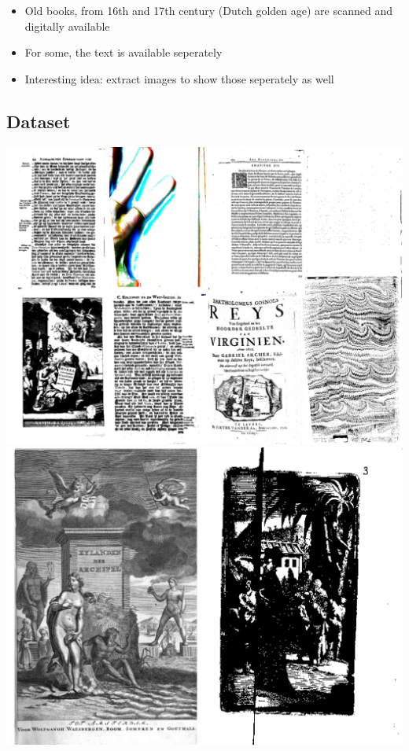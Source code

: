 

{
\begin{itemize}
	\item Old books, from 16th and 17th century (Dutch golden age)  are
scanned and digitally available
	\item For some, the text is available seperately
	\item Interesting idea: extract images to show those seperately as well
\end{itemize}
}

\subsection{Dataset}
{
	\includegraphics[width=.8\paperwidth]{resources/example1}
}
{
	\includegraphics[width=.8\paperwidth]{resources/example2}
}


